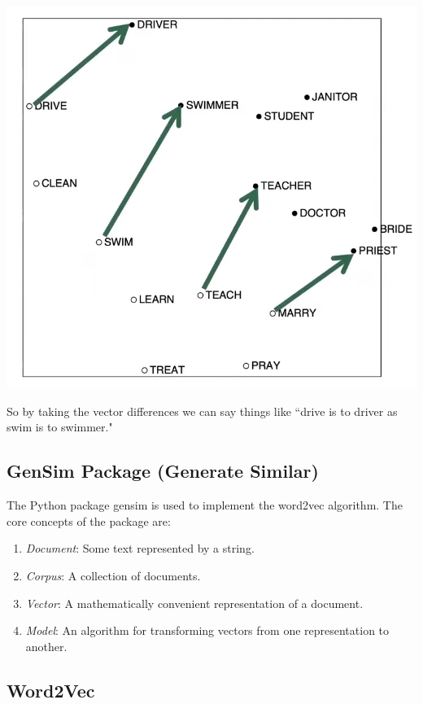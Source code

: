 \documentclass{article}
\begin{document}
    \begin{center}
        \includegraphics[scale=0.25]{img/COALS.png}
    \end{center}
    So by taking the vector differences we can say things like ``drive is to driver as swim is to swimmer." 

  \subsection{GenSim Package (Generate Similar)}

    The Python package gensim is used to implement the word2vec algorithm. The core concepts of the package are: 
    \begin{enumerate}
      \item \textit{Document}: Some text represented by a string. 
      \item \textit{Corpus}: A collection of documents. 
      \item \textit{Vector}: A mathematically convenient representation of a document. 
      \item \textit{Model}: An algorithm for transforming vectors from one representation to another. 
    \end{enumerate}

  \subsection{Word2Vec}
\end{document}
